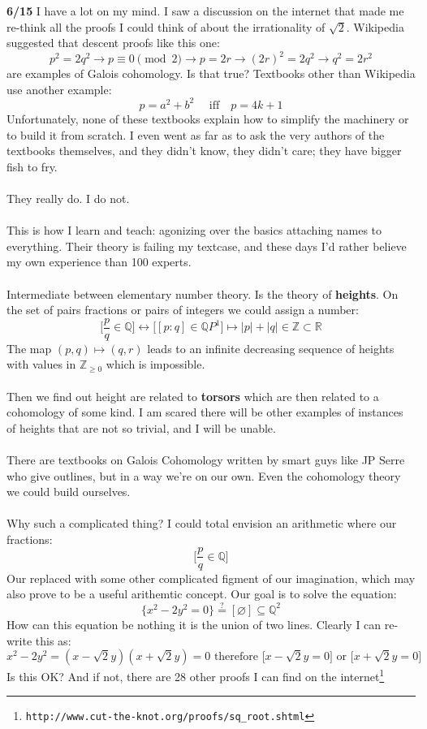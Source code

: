 \documentclass[12pt]{article}
\begin{document}
\noindent \textbf{6/15} I have a lot on my mind.  I saw a discussion on the internet that made me re-think all the proofs I could think of about the irrationality of $\sqrt{2}$.  Wikipedia suggested that descent proofs like this one:
$$ p^2 = 2q^2 \to p \equiv 0 \pmod 2 \to p = 2r \to (2r)^2 = 2q^2 \to q^2 = 2r^2  $$
are examples of Galois cohomology.  Is that true? Textbooks other than Wikipedia use another example:
$$ p = a^2 + b^2 \quad\text{ iff}\quad p = 4k+1 $$
Unfortunately, none of these textbooks explain how to simplify the machinery or to build it from scratch.   I even went as far as to ask the very authors of the textbooks themselves, and they didn't know, they didn't care; they have bigger fish to fry. \\ \\
They really do.  I do not.  \\ \\
This is how I learn and teach: agonizing over the basics attaching names to everything. Their theory is failing my textcase, and these days I'd rather believe my own experience than 100 experts.\\ \\
Intermediate between elementary number theory.  Is the theory of \textbf{heights}.  On the set of pairs fractions or pairs of integers we could assign a number:
$$ \bigg[ \frac{p}{q} \in \mathbb{Q} \bigg] \leftrightarrow  \bigg[ [p:q] \in \mathbb{Q}P^1 \bigg] \mapsto |p|+|q| \in \mathbb{Z} \subset \mathbb{R} $$
The map $(p,q) \mapsto (q,r)$ leads to an infinite decreasing sequence of heights with values in $\mathbb{Z}_{\geq 0}$ which is impossible.  \\ \\
Then we find out height are related to \textbf{torsors} which are then related to a cohomology of some kind.  I am scared there will be other examples of instances of heights that are not so trivial, and I will be unable. \\ \\
There are textbooks on Galois Cohomology written by smart guys like JP Serre who give outlines, but in a way we're on our own.  Even the cohomology theory we could build ourselves. \\ \\
Why such a complicated thing?  I could total envision an arithmetic where our fractions:
$$ \bigg[ \frac{p}{q} \in \mathbb{Q} \bigg] $$
Our replaced with some other complicated figment of our imagination, which may also prove to be a useful arithemtic concept.  Our goal is to solve the equation:
$$  \bigg\{  x^2 - 2y^2 = 0 \bigg\} \stackrel{?}{=} [\varnothing ]\subseteq \mathbb{Q}^2  $$
How can this equation be nothing it is the union of two lines.  Clearly I can re-write this as:
$$ x^2 - 2y^2 = (x-\sqrt{2}y) ( x + \sqrt{2}y) = 0 \text{ therefore } \Big[ x-\sqrt{2}y = 0\Big] \text{ or }
\Big[ x+\sqrt{2}y = 0 \Big] $$
Is this OK?  And if not, there are 28 other proofs I can find on the internet\footnote{\texttt{http://www.cut-the-knot.org/proofs/sq\_{}root.shtml}}
\end{document}
